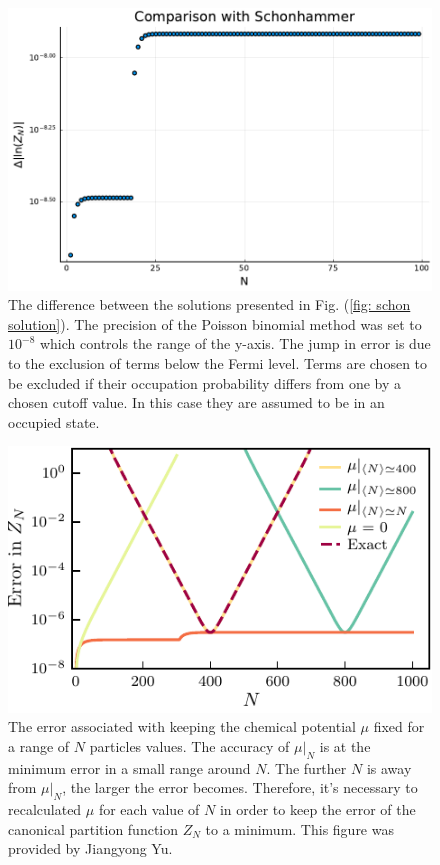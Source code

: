 \begin{figure}[H]
    \centering
    \includegraphics[scale=0.75]{figures/pdf/Benchdiff.pdf}
    \caption{The difference between the solutions presented in Fig. (\ref{fig: schon solution}). The precision of the Poisson binomial method was set to $10^{-8}$ which controls the range of the y-axis. The jump in error is due to the exclusion of terms below the Fermi level. Terms are chosen to be excluded if their occupation probability differs from one by a chosen cutoff value. In this case they are assumed to be in an occupied state. }
    \label{fig: schon diff}
\end{figure}
\begin{figure}[H]
    \centering
    \includegraphics[scale=1.4]{figures/pdf/Plot1.pdf}
    \caption{The error associated with keeping the chemical potential $\mu$ fixed for a range of $N$ particles values. The accuracy of $\mu|_N$ is at the minimum error in a small range around $N$. The further $N$ is away from $\mu|_N$, the larger the error becomes. Therefore, it's necessary to recalculated $\mu$ for each value of $N$ in order to keep the error of the canonical partition function $Z_N$ to a minimum. This figure was provided by Jiangyong Yu. }
    \label{fig:Errors}
\end{figure}
